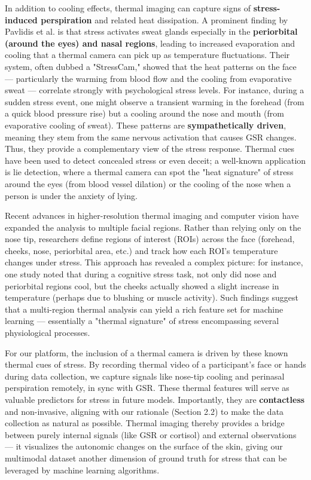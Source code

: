 \documentclass[11pt,a4paper]{report}
\begin{document}
In addition to cooling effects, thermal imaging can capture signs of
\textbf{stress-induced perspiration} and related heat dissipation. A
prominent finding by Pavlidis et al. is that stress activates sweat
glands especially in the \textbf{periorbital (around the eyes) and nasal
regions}, leading to increased evaporation and cooling that a thermal
camera can pick up as temperature
fluctuations\cite{DriverStressThermal2020}.
Their system, often dubbed a "StressCam," showed that the heat patterns
on the face --- particularly the warming from blood flow and the cooling
from evaporative sweat --- correlate strongly with psychological stress
levels\cite{DriverStressThermal2020}.
For instance, during a sudden stress event, one might observe a
transient warming in the forehead (from a quick blood pressure rise) but
a cooling around the nose and mouth (from evaporative cooling of sweat).
These patterns are \textbf{sympathetically driven}, meaning they stem from
the same nervous activation that causes GSR
changes\cite{DriverStressThermal2020}.
Thus, they provide a complementary view of the stress response. Thermal
cues have been used to detect concealed stress or even deceit; a
well-known application is lie detection, where a thermal camera can spot
the "heat signature" of stress around the eyes (from blood vessel
dilation) or the cooling of the nose when a person is under the anxiety
of lying.

Recent advances in higher-resolution thermal imaging and computer vision
have expanded the analysis to multiple facial regions. Rather than
relying only on the nose tip, researchers define regions of interest
(ROIs) across the face (forehead, cheeks, nose, periorbital area, etc.)
and track how each ROI's temperature changes under
stress\cite{ContactlessStressThermal2022}\cite{ContactlessStressThermal2022}.
This approach has revealed a complex picture: for instance, one study
noted that during a cognitive stress task, not only did nose and
periorbital regions cool, but the cheeks actually showed a slight
increase in temperature (perhaps due to blushing or muscle
activity)\cite{ContactlessStressThermal2022}.
Such findings suggest that a multi-region thermal analysis can yield a
rich feature set for machine learning --- essentially a "thermal
signature" of stress encompassing several physiological processes.

For our platform, the inclusion of a thermal camera is driven by these
known thermal cues of stress. By recording thermal video of a
participant's face or hands during data collection, we capture signals
like nose-tip cooling and perinasal perspiration remotely, in sync with
GSR. These thermal features will serve as valuable predictors for stress
in future models. Importantly, they are \textbf{contactless} and
non-invasive, aligning with our rationale (Section 2.2) to make the data
collection as natural as possible. Thermal imaging thereby provides a
bridge between purely internal signals (like GSR or cortisol) and
external observations --- it visualizes the autonomic changes on the
surface of the skin, giving our multimodal dataset another dimension of
ground truth for stress that can be leveraged by machine learning
algorithms.
\end{document}
